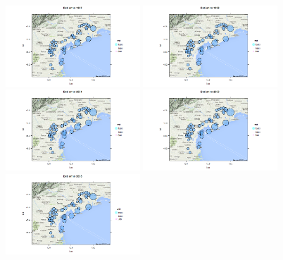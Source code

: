 \documentclass[a4paper,11pt,twoside,openright]{book}							%
\begin{document}
\begin{figure}[H]
\centering
\includegraphics[trim=0cm 0cm 0cm 0cm,clip=true,width=0.45\textwidth]{Immagini/venezia_dati/Dati1997.png}
\includegraphics[trim=0cm 0cm 0cm 0cm,clip=true,width=0.45\textwidth]{Immagini/venezia_dati/Dati1999.png}
\includegraphics[trim=0cm 0cm 0cm 0cm,clip=true,width=0.45\textwidth]{Immagini/venezia_dati/Dati2001.png}
\includegraphics[trim=0cm 0cm 0cm 0cm,clip=true,width=0.45\textwidth]{Immagini/venezia_dati/Dati2003.png}
\includegraphics[trim=0cm 0cm 0cm 0cm,clip=true,width=0.45\textwidth]{Immagini/venezia_dati/Dati2005.png}

\end{figure}
\end{document}
